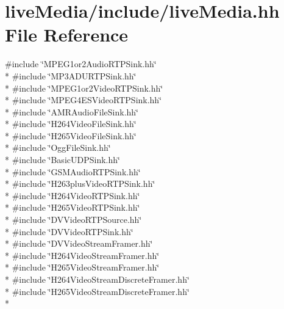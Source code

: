 \section{live\+Media/include/live\+Media.hh File Reference}
\label{liveMedia_8hh}
{\ttfamily \#include \char`\"{}M\+P\+E\+G1or2\+Audio\+R\+T\+P\+Sink.\+hh\char`\"{}}\\*
{\ttfamily \#include \char`\"{}M\+P3\+A\+D\+U\+R\+T\+P\+Sink.\+hh\char`\"{}}\\*
{\ttfamily \#include \char`\"{}M\+P\+E\+G1or2\+Video\+R\+T\+P\+Sink.\+hh\char`\"{}}\\*
{\ttfamily \#include \char`\"{}M\+P\+E\+G4\+E\+S\+Video\+R\+T\+P\+Sink.\+hh\char`\"{}}\\*
{\ttfamily \#include \char`\"{}A\+M\+R\+Audio\+File\+Sink.\+hh\char`\"{}}\\*
{\ttfamily \#include \char`\"{}H264\+Video\+File\+Sink.\+hh\char`\"{}}\\*
{\ttfamily \#include \char`\"{}H265\+Video\+File\+Sink.\+hh\char`\"{}}\\*
{\ttfamily \#include \char`\"{}Ogg\+File\+Sink.\+hh\char`\"{}}\\*
{\ttfamily \#include \char`\"{}Basic\+U\+D\+P\+Sink.\+hh\char`\"{}}\\*
{\ttfamily \#include \char`\"{}G\+S\+M\+Audio\+R\+T\+P\+Sink.\+hh\char`\"{}}\\*
{\ttfamily \#include \char`\"{}H263plus\+Video\+R\+T\+P\+Sink.\+hh\char`\"{}}\\*
{\ttfamily \#include \char`\"{}H264\+Video\+R\+T\+P\+Sink.\+hh\char`\"{}}\\*
{\ttfamily \#include \char`\"{}H265\+Video\+R\+T\+P\+Sink.\+hh\char`\"{}}\\*
{\ttfamily \#include \char`\"{}D\+V\+Video\+R\+T\+P\+Source.\+hh\char`\"{}}\\*
{\ttfamily \#include \char`\"{}D\+V\+Video\+R\+T\+P\+Sink.\+hh\char`\"{}}\\*
{\ttfamily \#include \char`\"{}D\+V\+Video\+Stream\+Framer.\+hh\char`\"{}}\\*
{\ttfamily \#include \char`\"{}H264\+Video\+Stream\+Framer.\+hh\char`\"{}}\\*
{\ttfamily \#include \char`\"{}H265\+Video\+Stream\+Framer.\+hh\char`\"{}}\\*
{\ttfamily \#include \char`\"{}H264\+Video\+Stream\+Discrete\+Framer.\+hh\char`\"{}}\\*
{\ttfamily \#include \char`\"{}H265\+Video\+Stream\+Discrete\+Framer.\+hh\char`\"{}}\\*
